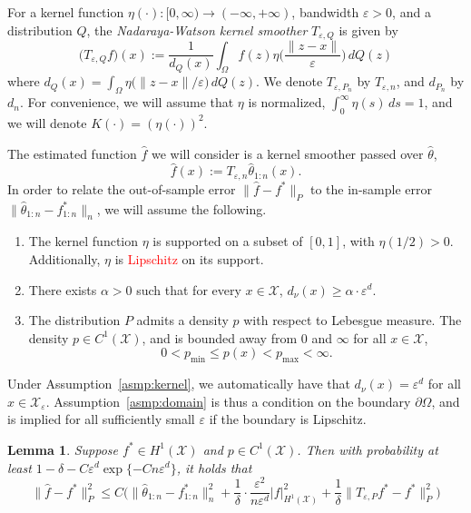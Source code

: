 \documentclass{article}
\newcommand{\1}{\mathbf{1}}
\newcommand{\mc}[1]{\mathcal{#1}}
\newcommand{\wh}[1]{\widehat{#1}}
\newtheorem{lemma}{Lemma}
\theoremstyle{definition}
\theoremstyle{remark}
\begin{document}
For a kernel function $\eta(\cdot): [0,\infty) \to (-\infty,+\infty)$, bandwidth $\varepsilon > 0$, and a distribution $Q$, the \emph{Nadaraya-Watson kernel smoother} $T_{\varepsilon,Q}$ is given by
\begin{equation*}
\bigl(T_{\varepsilon,Q}f)(x) := \frac{1}{d_Q(x)} \int_{\Omega} f(z)\eta\biggl(\frac{\|z - x\|}{\varepsilon}\biggr) \,dQ(z)
\end{equation*}
where $d_Q(x) = \int_{\Omega} \eta\bigl(\|z - x\|/\varepsilon\bigr) \,dQ(z)$. We denote $T_{\varepsilon,P_n}$ by $T_{\varepsilon,n}$, and $d_{P_n}$ by $d_n$. For convenience, we will assume that $\eta$ is normalized, $\int_{0}^{\infty} \eta(s) \,ds = 1$, and we will denote $K(\cdot) = (\eta(\cdot))^2$.

The estimated function $\wh{f}$ we will consider is a kernel smoother passed over $\wh{\theta}$,
\begin{equation}
\label{eqn:kernel_smoother_laplacian_eigenmaps}
\wh{f}(x) := T_{\varepsilon,n}\wh{\theta}_{1:n}(x).
\end{equation}
In order to relate the out-of-sample error $\|\wh{f} - f^{\ast}\|_P$ to the in-sample error $\|\wh{\theta}_{1:n} - f^{\ast}_{1:n}\|_n$, we will assume the following.
\begin{enumerate}[label=(A\arabic*)]
	\item
	\label{asmp:kernel}
	The kernel function $\eta$ is supported on a subset of $[0,1]$, with $\eta(1/2) > 0$. Additionally, $\eta$ is \textcolor{red}{Lipschitz} on its support.
	\item 
	\label{asmp:domain} There exists $\alpha > 0$ such that for every $x \in \mc{X}$, $d_{\nu}(x) \geq \alpha \cdot \varepsilon^d$.
	\item 
	\label{asmp:density}The distribution $P$ admits a density $p$ with respect to Lebesgue measure. The density $p \in C^1(\mc{X})$, and is bounded away from $0$ and $\infty$ for all $x \in \mc{X}$,
	\begin{equation*}
	0 < p_{\min} \leq p(x) < p_{\max} < \infty.
	\end{equation*}
\end{enumerate}
Under Assumption~\ref{asmp:kernel}, we automatically have that $d_\nu(x) = \varepsilon^d$ for all $x \in \mc{X}_{\varepsilon}$. Assumption~\ref{asmp:domain} is thus a condition on the boundary $\partial \Omega$, and is implied for all sufficiently small $\varepsilon$ if the boundary is Lipschitz. 
\begin{lemma}
	\label{lem:kernel_smoothing_laplacian_eigenmaps}
	Suppose $f^{\ast} \in H^1(\mc{X})$ and $p \in C^1(\mc{X})$. Then with probability at least $1 - \delta - C\varepsilon^d\exp\{-Cn\varepsilon^d\}$, it holds that
	\begin{equation*}
	\|\wh{f} - f^{\ast}\|_P^2 \leq C\biggl(\|\wh{\theta}_{1:n} - f^{\ast}_{1:n}\|_n^2 + \frac{1}{\delta} \cdot \frac{\varepsilon^2}{n\varepsilon^d} |f|_{H^1(\mc{X})}^2 + \frac{1}{\delta}\|T_{\varepsilon,P}f^{\ast} - f^{\ast}\|_P^2\biggr)
	\end{equation*}
\end{lemma}
\end{document}

